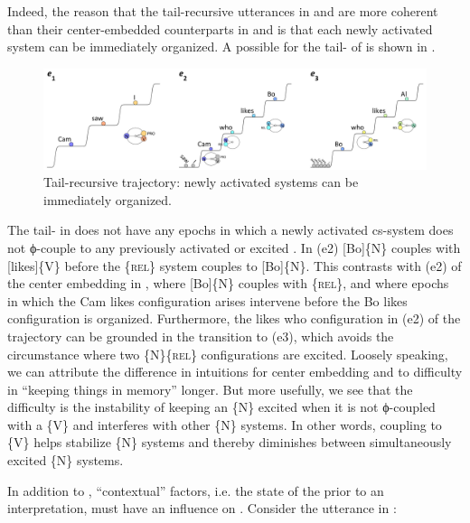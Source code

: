   Indeed, the reason that the tail-recursive utterances in  and  are more coherent than their center-embedded counterparts in  and  is that each newly activated system can be immediately organized. A possible  for the tail- of  is shown in {}. 

  
\begin{figure}
\includegraphics[width=\textwidth]{figures/Tilsen-img133.png}
\caption{Tail-recursive trajectory: newly activated systems can be immediately organized.}
\label{fig:6:14}
\end{figure}
 

  The tail- in {} does not have any epochs in which a newly activated cs-system does not ϕ-couple to any previously activated or excited . In (e2) [Bo]\{N\} couples with [likes]\{V\} before the \{\textsc{rel}\} system couples to [Bo]\{N\}. This contrasts with (e2) of the center embedding in {}, where [Bo]\{N\} couples with \{\textsc{rel}\}, and where epochs in which the {\textbar}Cam likes{\textbar} configuration arises intervene before the {\textbar}Bo likes{\textbar} configuration is organized. Furthermore, the {\textbar}likes who{\textbar} configuration in (e2) of the  trajectory can be grounded in the transition to (e3), which avoids the circumstance where two \{N\}\{\textsc{rel}\} configurations are excited. Loosely speaking, we can attribute the difference in  intuitions for center embedding and  to difficulty in “keeping things in memory” longer. But more usefully, we see that the difficulty is the instability of keeping an \{N\} excited when it is not ϕ-coupled with a \{V\} and interferes with other \{N\} systems. In other words, coupling to \{V\} helps stabilize \{N\} systems and thereby diminishes  between simultaneously excited \{N\} systems.

  In addition to , “contextual” factors, i.e. the state of the  prior to an interpretation, must have an influence on . Consider the utterance in :

